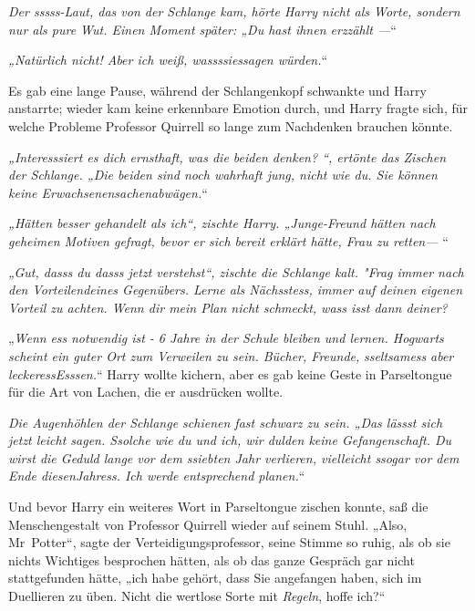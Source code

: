 {\emph{Der sssss-Laut, das von der Schlange kam, hörte Harry nicht als Worte, sondern nur als pure Wut. Einen Moment später: „\emph{Du hast ihnen} \emph{erzzählt} \emph{—}}“

\emph{„\emph{Natürlich nicht! Aber ich weiß,} \emph{wassssiessagen} \emph{würden}.}“

Es gab eine lange Pause, während der Schlangenkopf schwankte und Harry anstarrte; wieder kam keine erkennbare Emotion durch, und Harry fragte sich, für welche Probleme Professor Quirrell so lange zum Nachdenken brauchen könnte.

\emph{„\emph{Interesssiert} \emph{es dich ernsthaft, was die beiden denken? }“, ertönte das Zischen der Schlange. „\emph{Die beiden} \emph{sind} \emph{noch wahrhaft jung, nicht wie} \emph{du. Sie können keine} \emph{Erwachsenensachenabwägen}.}“

\emph{„\emph{Hätten besser gehandelt} \emph{als ich}“, zischte Harry. „\emph{Junge-Freund hätten nach geheimen Motiven gefragt, bevor er sich bereit erklärt hätte, Frau zu retten—} }“

\emph{\emph{„Gut}, \emph{dasss} \emph{du} \emph{dasss} \emph{jetzt verstehst}“, zischte die Schlange kalt. \emph{"Frag immer nach den Vorteilendeines Gegenübers. Lerne als} \emph{Nächsstess, immer auf} \emph{deinen} \emph{eigenen Vorteil zu achten. Wenn} \emph{dir} \emph{mein Plan} \emph{nicht schmeckt,} \emph{wass} \emph{isst dann deiner?}}

„\emph{Wenn} \emph{ess} \emph{notwendig ist - 6 Jahre in der Schule bleiben und lernen. Hogwarts scheint ein guter Ort zum Verweilen zu sein. Bücher, Freunde,} \emph{sseltsamess} \emph{aber} \emph{leckeressEsssen.}“ Harry wollte kichern, aber es gab keine Geste in Parseltongue für die Art von Lachen, die er ausdrücken wollte.

\emph{Die Augenhöhlen der Schlange schienen fast schwarz zu sein. „\emph{Das} \emph{lässst} \emph{sich} \emph{jetzt} \emph{leicht sagen.} \emph{Ssolche} \emph{wie du und ich, wir dulden keine Gefangenschaft. Du wirst die Geduld lange vor dem} \emph{ssiebten} \emph{Jahr verlieren, vielleicht} \emph{ssogar} \emph{vor dem Ende diesenJahress. Ich werde entsprechend planen.}}“

Und bevor Harry ein weiteres Wort in Parseltongue zischen konnte, saß die Menschengestalt von Professor Quirrell wieder auf seinem Stuhl. „Also, Mr~Potter“, sagte der Verteidigungsprofessor, seine Stimme so ruhig, als ob sie nichts Wichtiges besprochen hätten, als ob das ganze Gespräch gar nicht stattgefunden hätte, „ich habe gehört, dass Sie angefangen haben, sich im Duellieren zu üben. Nicht die wertlose Sorte mit \emph{Regeln}, hoffe ich?“

}
